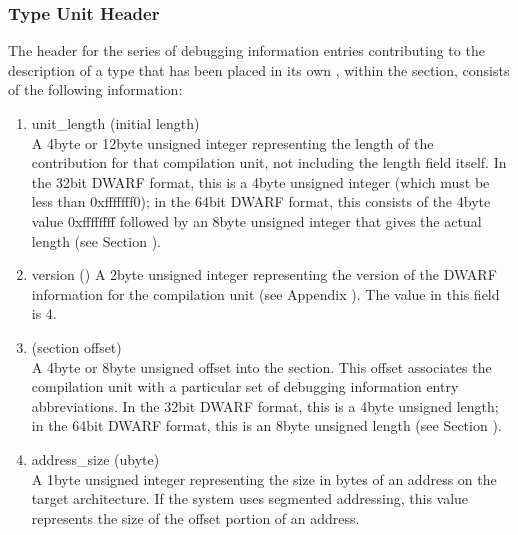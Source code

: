 \subsubsection{Type Unit Header}
\label{datarep:typeunitheader}

The header for the series of debugging information entries
contributing to the description of a type that has been
placed in its own , within the 
 section,
consists of the following information:

\begin{enumerate}[1.]

\item unit\_length (initial length) \\
A 4\dash byte or 12\dash byte unsigned integer 
representing the length
of the  contribution for that compilation unit,
not including the length field itself. In the 32\dash bit DWARF
format, this is a 4\dash byte unsigned integer (which must be
less than 0xfffffff0); in the 64\dash bit DWARF format, this
consists of the 4\dash byte value 0xffffffff followed by an 
8\dash byte unsigned integer that gives the actual length
(see Section ).

\item  version ()
A 2\dash byte unsigned integer representing the version of the
DWARF information for the 
compilation unit 
(see Appendix ). 
The value in this field is 4.

\item {} (section offset) \\
A 
4\dash byte or 8\dash byte unsigned offset into the 
section. This offset associates the compilation unit with a
particular set of debugging information entry abbreviations. In
the 32\dash bit DWARF format, this is a 4\dash byte unsigned length;
in the 64\dash bit DWARF format, this is an 8\dash byte unsigned length
(see Section ).

\item address\_size (ubyte) \\
A 1\dash byte unsigned integer representing the size 
in bytes of
an address on the target architecture. If the system uses
segmented addressing, this value represents the size of the
offset portion of an address.



\end{enumerate}
